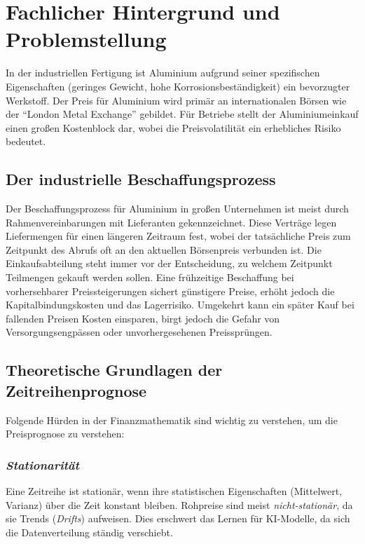 \section{Fachlicher Hintergrund und Problemstellung}
\label{sec:fachlicher_hintergrund}

In der industriellen Fertigung ist Aluminium aufgrund seiner spezifischen Eigenschaften (geringes Gewicht, hohe Korrosionsbeständigkeit) ein bevorzugter Werkstoff.
Der Preis für Aluminium wird primär an internationalen Börsen wie der "`London Metal Exchange"' gebildet.
Für Betriebe stellt der Aluminiumeinkauf einen großen Kostenblock dar, wobei die Preisvolatilität ein erhebliches Risiko bedeutet.

\subsection{Der industrielle Beschaffungsprozess}

Der Beschaffungsprozess für Aluminium in großen Unternehmen ist meist durch Rahmenvereinbarungen mit Lieferanten gekennzeichnet.
Diese Verträge legen Liefermengen für einen längeren Zeitraum fest, wobei der tatsächliche Preis zum Zeitpunkt des Abrufs oft an den aktuellen Börsenpreis verbunden ist.
Die Einkaufsabteilung steht immer vor der Entscheidung, zu welchem Zeitpunkt Teilmengen gekauft werden sollen.
Eine frühzeitige Beschaffung bei vorhersehbarer Preissteigerungen sichert günstigere Preise, erhöht jedoch die Kapitalbindungskosten und das Lagerrisiko.
Umgekehrt kann ein später Kauf bei fallenden Preisen Kosten einsparen, birgt jedoch die Gefahr von Versorgungsengpässen oder unvorhergesehenen Preissprüngen.

\subsection{Theoretische Grundlagen der Zeitreihenprognose}

Folgende Hürden in der Finanzmathematik sind wichtig zu verstehen, um die Preisprognose zu verstehen:

\subsubsection{\emph{Stationarität}}
Eine Zeitreihe ist stationär, wenn ihre statistischen Eigenschaften (Mittelwert, Varianz) über die Zeit konstant bleiben.
Rohpreise sind meist \emph{nicht-stationär}, da sie Trends (\emph{Drifts}) aufweisen.
Dies erschwert das Lernen für KI-Modelle, da sich die Datenverteilung ständig verschiebt.

